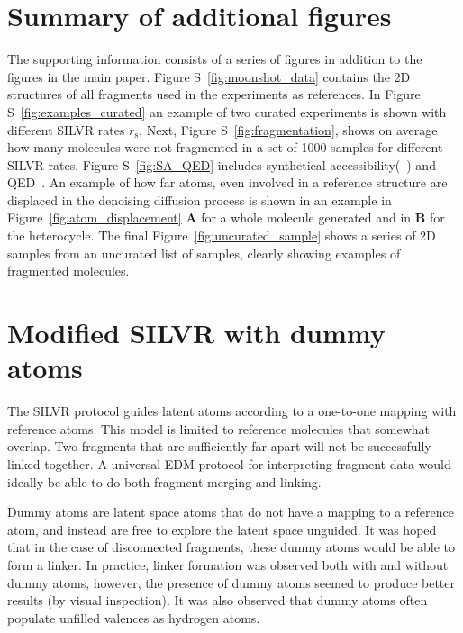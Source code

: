 \documentclass[journal=jacsat,manuscript=article]{achemso}
\begin{document}
\newpage 
\begin{suppinfo}

\section{Summary of additional figures }
The supporting information consists of a series of figures in addition to the figures in the main paper. Figure S~\ref{fig:moonshot_data} contains the 2D structures of all fragments used in the experiments as references. In Figure S~\ref{fig:examples_curated} an example of two curated experiments is shown with different SILVR rates $r_{\mathrm{s}}$. Next, Figure S~\ref{fig:fragmentation}, shows on average how many molecules were not-fragmented in a set of 1000 samples for different SILVR rates. Figure S~\ref{fig:SA_QED} includes synthetical accessibility(~\cite{ertl2009estimation}) and QED~\cite{bickerton2012quantifying, wildman1999prediction}. An example of how far atoms, even involved in a reference structure are displaced in the denoising diffusion process is shown in an example in Figure~\ref{fig:atom_displacement} \textbf{A} for a whole molecule generated and in \textbf{B} for the heterocycle.  The final Figure~\ref{fig:uncurated_sample} shows a series of 2D samples from an uncurated list of samples, clearly showing examples of fragmented molecules.  


\section{Modified SILVR with dummy atoms}
The SILVR protocol guides latent atoms according to a one-to-one mapping with reference atoms. This model is limited to reference molecules that somewhat overlap. Two fragments that are sufficiently far apart will not be successfully linked together. A universal EDM protocol for interpreting fragment data would ideally be able to do both fragment merging and linking.

Dummy atoms are latent space atoms that do not have a mapping to a reference atom, and instead are free to explore the latent space unguided. It was hoped that in the case of disconnected fragments, these dummy atoms would be able to form a linker. In practice, linker formation was observed both with and without dummy atoms, however, the presence of dummy atoms seemed to produce better results (by visual inspection). It was also observed that dummy atoms often populate unfilled valences as hydrogen atoms. 


\end{suppinfo}
\end{document}
